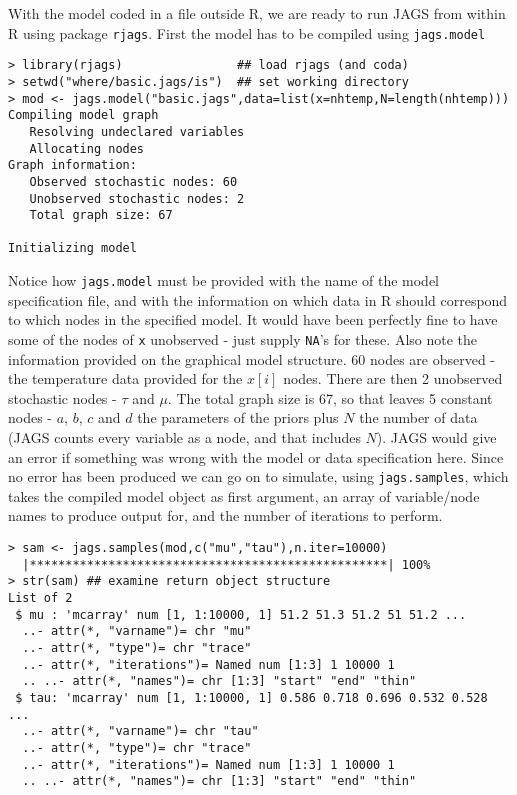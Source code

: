 \documentclass[10pt] {article}
\theoremstyle{definition}
\begin{document}
With the model coded in a file outside R, we are ready to run JAGS from within R using package {\tt rjags}. First the model has to be compiled using {\tt jags.model} 
\begin{lstlisting}
> library(rjags)                ## load rjags (and coda)
> setwd("where/basic.jags/is")  ## set working directory
> mod <- jags.model("basic.jags",data=list(x=nhtemp,N=length(nhtemp)))
Compiling model graph
   Resolving undeclared variables
   Allocating nodes
Graph information:
   Observed stochastic nodes: 60
   Unobserved stochastic nodes: 2
   Total graph size: 67

Initializing model
\end{lstlisting}
Notice how {\tt jags.model} must be provided with the name of the model specification file, and with the information on which data in R should correspond to which nodes in the  specified model. It would have been perfectly fine to have some of the nodes of {\tt x} unobserved - just supply {\tt NA}'s for these. Also note the information provided on the graphical model structure. 60 nodes are observed - the temperature data provided for the $x[i]$ nodes. There are then 2 unobserved stochastic nodes - $\tau$ and $\mu$. The total graph size is 67, so that leaves 5 constant nodes - $a$, $b$, $c$ and $d$ the parameters of the priors plus $N$ the number of data (JAGS counts every variable as a node, and that includes $N$). JAGS would give an error if something was wrong with the model or data specification here. Since no error has been produced we can go on to simulate, using {\tt jags.samples}, which takes the compiled model object as first argument, an array of variable/node names to produce output for, and the number of iterations to perform.   
\begin{lstlisting}
> sam <- jags.samples(mod,c("mu","tau"),n.iter=10000)
  |**************************************************| 100%
> str(sam) ## examine return object structure
List of 2
 $ mu : 'mcarray' num [1, 1:10000, 1] 51.2 51.3 51.2 51 51.2 ...
  ..- attr(*, "varname")= chr "mu"
  ..- attr(*, "type")= chr "trace"
  ..- attr(*, "iterations")= Named num [1:3] 1 10000 1
  .. ..- attr(*, "names")= chr [1:3] "start" "end" "thin"
 $ tau: 'mcarray' num [1, 1:10000, 1] 0.586 0.718 0.696 0.532 0.528 ...
  ..- attr(*, "varname")= chr "tau"
  ..- attr(*, "type")= chr "trace"
  ..- attr(*, "iterations")= Named num [1:3] 1 10000 1
  .. ..- attr(*, "names")= chr [1:3] "start" "end" "thin"
\end{lstlisting}
\end{document}
